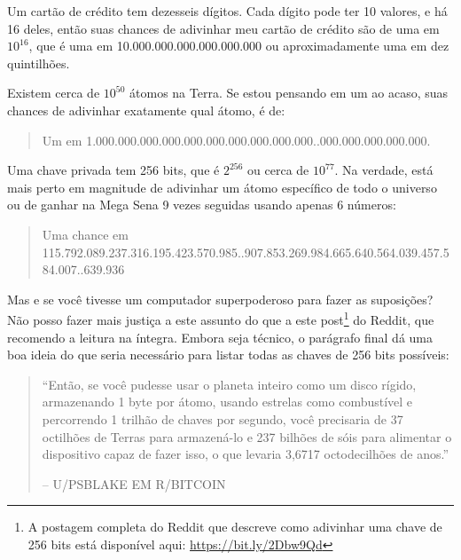 Um cartão de crédito tem dezesseis dígitos. Cada dígito pode ter 10 valores, e há 16 deles, então suas chances de adivinhar meu cartão de crédito são de uma em \(10^{16}\), que é uma em 10.000.000.000.000.000.000 ou aproximadamente uma em dez quintilhões.

Existem cerca de \(10^{50}\) átomos na Terra. Se estou pensando em um ao acaso, suas chances de adivinhar exatamente qual átomo, é de:

\begin{samepage}
\begin{quote}{Um em 1.000.000.000.000.000.000.000.000.000.000..000.000.000.000.000.}\end{quote}
\end{samepage}

Uma chave privada tem 256 bits, que é \(2^{256}\) ou cerca de \(10^{77}\). Na verdade, está mais perto em magnitude de adivinhar um átomo específico de todo o universo ou de ganhar na Mega Sena 9 vezes seguidas usando apenas 6 números:

\begin{samepage}
\begin{quote}{Uma chance em 115.792.089.237.316.195.423.570.985..907.853.269.984.665.640.564.039.457.584.007..639.936}\end{quote}
\end{samepage}

Mas e se você tivesse um computador superpoderoso para fazer as suposições? Não posso fazer mais justiça a este assunto do que a este post\footnote{A postagem completa do Reddit que descreve como adivinhar uma chave de 256 bits está disponível aqui: \url{https://bit.ly/2Dbw9Qd}} do Reddit, que recomendo a leitura na íntegra. Embora seja técnico, o parágrafo final dá uma boa ideia do que seria necessário para listar todas as chaves de 256 bits possíveis:

\begin{quotation}\begin{samepage}
\enquote{Então, se você pudesse usar o planeta inteiro como um disco rígido, armazenando 1 byte por átomo, usando estrelas como combustível e percorrendo 1 trilhão de chaves por segundo, você precisaria de 37 octilhões de Terras para armazená-lo e 237 bilhões de sóis para alimentar o dispositivo capaz de fazer isso, o que levaria 3,6717 octodecilhões de anos.}
\begin{flushright} -- U/PSBLAKE EM R/BITCOIN
\end{flushright}\end{samepage}\end{quotation}

